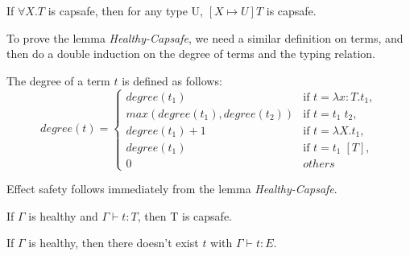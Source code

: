 \begin{lemma}
  If $\forall X.T$ is capsafe, then for any type U, $[X \mapsto U]T$
  is capsafe.
\end{lemma}

To prove the lemma \emph{Healthy-Capsafe}, we need a similar
definition on terms, and then do a double induction on the degree of
terms and the typing relation.

\begin{definition}
  The degree of a term $t$ is defined as follows:
  \begin{equation*}
    degree(t) =
    \begin{cases}
      degree(t_1) & \text{if } t = \lambda x:T.t_1,\\
      max(degree(t_1), degree(t_2)) & \text{if } t = t_1 \; t_2,\\
      degree(t_1) + 1 & \text{if } t = \lambda X.t_1,\\
      degree(t_1) & \text{if } t = t_1 \; [T],\\
      0 & others
    \end{cases}
  \end{equation*}
\end{definition}

Effect safety follows immediately from the lemma
\emph{Healthy-Capsafe}.

\begin{lemma}
  If $\Gamma$ is healthy and $\Gamma \vdash t : T$, then T is capsafe.
\end{lemma}

\begin{theorem}
  If $\Gamma$ is healthy, then there doesn't exist $t$ with
  $\Gamma \vdash t : E$.
\end{theorem}
